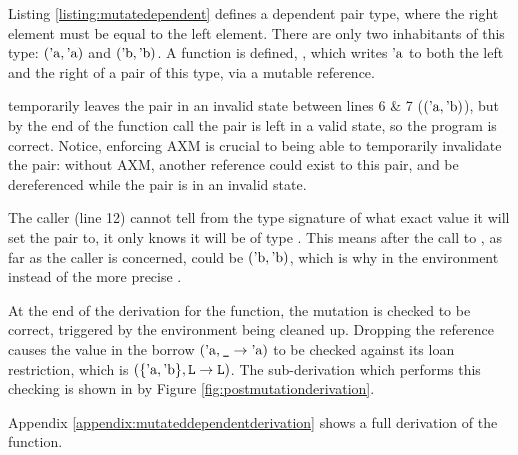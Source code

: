\documentclass[12pt,twoside]{report}
\begin{document}
Listing \ref{listing:mutatedependent} defines a dependent pair type, where the right element must be equal to the left element. There are only two inhabitants of this type: $(\text{'a}, \text{'a})$ and $(\text{'b}, \text{'b})$. A function is defined, , which writes $\text{'a}$ to both the left and the right of a pair of this type, via a mutable reference.

 temporarily leaves the pair in an invalid state between lines 6 \& 7 ($(\text{'a}, \text{'b})$), but by the end of the function call the pair is left in a valid state, so the program is correct. Notice, enforcing AXM is crucial to being able to temporarily invalidate the pair: without AXM, another reference could exist to this pair, and be dereferenced while the pair is in an invalid state.

The caller (line 12) cannot tell from the type signature of  what exact value it will set the pair to, it only knows it will be of type . This means after the call to , as far as the caller is concerned,  could be $(\text{'b}, \text{'b})$, which is why  in the environment instead of the more precise .

At the end of the derivation for the  function, the mutation is checked to be correct, triggered by the environment being cleaned up. Dropping the reference causes the value in the borrow $(\text{'a}, \text{\texttt{\_}} \rightarrow \text{'a})$ to be checked against its loan restriction, which is $(\{\text{'a}, \text{'b}\}, \text{\texttt{L}} \rightarrow \text{\texttt{L}})$. The sub-derivation which performs this checking is shown in by Figure \ref{fig:postmutationderivation}.

Appendix \ref{appendix:mutateddependentderivation} shows a full derivation of the  function.
\end{document}
